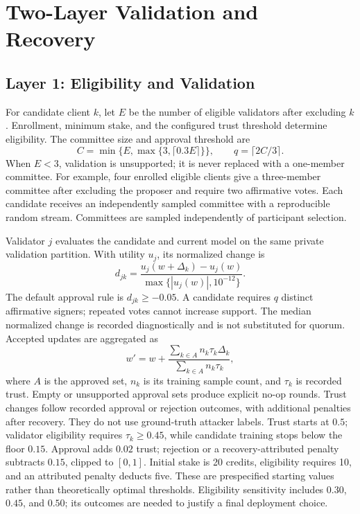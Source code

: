 \section{Two-Layer Validation and Recovery}
\label{sec:framework}

\subsection{Layer 1: Eligibility and Validation}
For candidate client $k$, let $E$ be the number of eligible validators after
excluding $k$. Enrollment, minimum stake, and the configured trust threshold
determine eligibility. The committee size and approval threshold are
\begin{equation}
 C=\min\{E,\max\{3,\lceil0.3E\rceil\}\},\qquad
 q=\lceil2C/3\rceil.
\end{equation}
When $E<3$, validation is unsupported; it is never replaced with a one-member
committee. For example, four enrolled eligible clients give a three-member
committee after excluding the proposer and require two affirmative votes.
Each candidate receives an independently sampled committee with a reproducible
random stream. Committees are sampled independently of participant selection.

Validator $j$ evaluates the candidate and current model on the same private
validation partition. With utility $u_j$, its normalized change is
\begin{equation}
 d_{jk}=\frac{u_j(w+\Delta_k)-u_j(w)}{\max\{|u_j(w)|,10^{-12}\}}.
\end{equation}
The default approval rule is $d_{jk}\geq-0.05$. A candidate requires $q$
distinct affirmative signers; repeated votes cannot increase support.
The median normalized change is recorded diagnostically and is not substituted
for quorum. Accepted updates are aggregated as
\begin{equation}
 w'=w+\frac{\sum_{k\in A} n_k\tau_k\Delta_k}{\sum_{k\in A}n_k\tau_k},
\end{equation}
where $A$ is the approved set, $n_k$ is its training sample count, and $\tau_k$
is recorded trust. Empty or unsupported approval sets produce explicit no-op
rounds. Trust changes follow recorded approval or rejection outcomes, with
additional penalties after recovery. They do not use ground-truth attacker labels.
Trust starts at $0.5$; validator eligibility requires $\tau_k\geq0.45$, while
candidate training stops below the floor $0.15$. Approval adds $0.02$ trust;
rejection or a recovery-attributed penalty subtracts $0.15$, clipped to $[0,1]$.
Initial stake is 20 credits, eligibility requires 10, and an attributed penalty
deducts five. These are prespecified starting values rather than theoretically
optimal thresholds. Eligibility sensitivity includes $0.30$, $0.45$, and $0.50$;
its outcomes are needed to justify a final deployment choice.

